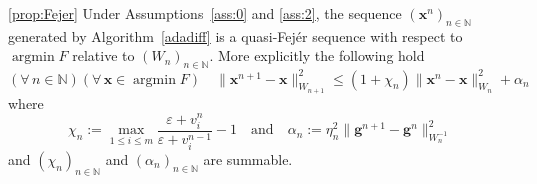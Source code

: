 \documentclass[11pt]{article}
\theoremstyle{plain}
\theoremstyle{definition}
\theoremstyle{remark}
\newcommand{\norm}[1]{\lVert{#1}\rVert}
\DeclareMathOperator*{\argmin}{argmin}
\newcommand{\bx}{\bm{x}}
\newcommand{\buu}{\bm{g}}
\newcommand{\iter}{n}
\newcommand{\N}{\mathbb{N}}
\newcommand{\W}{W}
\begin{document}
\begin{customprop}{\ref{prop:Fejer}}
Under Assumptions~\ref{ass:0} and \ref{ass:2},
the sequence $(\bx^\iter)_{\iter\in \N}$ generated by Algorithm~\ref{adadiff} is a quasi-Fej\'er sequence with respect to $\argmin F$ relative to $(\W_\iter)_{\iter\in \N}$. More explicitly the following hold
\begin{equation*}
(\forall\,\iter\in \N)(\forall\,\bx\in \argmin F)\quad \norm{\bx^{\iter+1}-\bx}^2_{\W_{\iter+1}} \leq (1+\chi_\iter) \norm{\bx^{\iter}-\bx}^2_{\W_{\iter}} + \alpha_\iter
\end{equation*}
where
\begin{equation*}
\chi_\iter :=\max_{1\leq i\leq m}\frac{\varepsilon + v_i^{\iter}}{\varepsilon + v_i^{\iter-1}}- 1
\quad\text{and}\quad \alpha_\iter := \eta_\iter^2 \norm{\buu^{\iter+1} - \buu^{\iter}}_{\W_\iter^{-1}}^2
\end{equation*}
and $(\chi_\iter)_{\iter\in \N}$ and $(\alpha_\iter)_{\iter\in \N}$ are summable.
\end{customprop}
\end{document}
